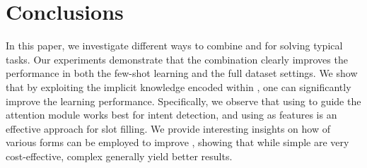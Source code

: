 \section{Conclusions}
\vspace{-1mm} In this paper, we investigate different ways to combine \NNs and \REs for solving typical \SLU tasks. Our experiments
demonstrate that the combination clearly improves the \NN performance in both the few-shot learning and the  full dataset settings. We show
that by exploiting the implicit knowledge encoded within \REs, one can significantly improve the learning performance. Specifically, we
observe that using \REs to guide the attention module works best for intent detection, and using \REtags as features is an effective
approach for slot filling. We provide interesting insights on how \REs of various forms can be employed to improve \NNs, showing that while
simple \REs are very cost-effective, complex \REs generally yield better results.
